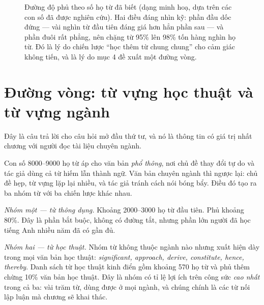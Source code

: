 \documentclass[../../english.tex]{subfiles}
\begin{document}
\begin{figure}[H]\centering
{}
\caption{Đường độ phủ theo số họ từ đã biết (dạng minh hoạ, dựa trên các con số đã được nghiên cứu). Hai điều đáng nhìn kỹ: phần đầu dốc đứng --- vài nghìn từ đầu tiên đáng giá hơn hẳn phần sau --- và phần đuôi rất phẳng, nên chặng từ 95\% lên 98\% tốn hàng nghìn họ từ. Đó là lý do chiến lược ``học thêm từ chung chung'' cho cảm giác không tiến, và là lý do mục 4 đề xuất một đường vòng.}
\label{fig:coverage}
\end{figure}

\section{Đường vòng: từ vựng học thuật và từ vựng ngành}

Đây là câu trả lời cho câu hỏi mở đầu thứ tư, và nó là thông tin có giá trị nhất chương với người đọc tài liệu chuyên ngành.

Con số 8000--9000 họ từ áp cho văn bản \emph{phổ thông}, nơi chủ đề thay đổi tự do và tác giả dùng cả từ hiếm lẫn thành ngữ. Văn bản chuyên ngành thì ngược lại: chủ đề hẹp, từ vựng lặp lại nhiều, và tác giả tránh cách nói bóng bẩy. Điều đó tạo ra ba nhóm từ với ba chiến lược khác nhau.

\emph{Nhóm một --- từ thông dụng.} Khoảng 2000--3000 họ từ đầu tiên. Phủ khoảng 80\%. Đây là phần bắt buộc, không có đường tắt, nhưng phần lớn người đã học tiếng Anh nhiều năm đã có gần đủ.

\emph{Nhóm hai --- từ học thuật.} Nhóm từ không thuộc ngành nào nhưng xuất hiện dày trong mọi văn bản học thuật: \emph{significant, approach, derive, constitute, hence, thereby}. Danh sách từ học thuật kinh điển gồm khoảng 570 họ từ và phủ thêm chừng 10\% văn bản học thuật\cite{coxhead2000}. Đây là nhóm có tỉ lệ lợi ích trên công sức \emph{cao nhất} trong cả ba: vài trăm từ, dùng được ở mọi ngành, và chúng chính là các từ nối lập luận mà chương  sẽ khai thác.
\end{document}
